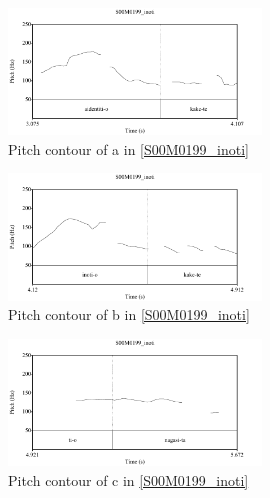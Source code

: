 \begin{figure}
	\begin{center}
	\includegraphics[width=0.6\textwidth]{sounds/S00M0199_aidenthithi.pdf}
	\caption{Pitch contour of a in \ref{S00M0199_inoti}}
	\label{S00M0199_aidenthithiF}
	\end{center}
\end{figure}
\begin{figure}
	\begin{center}
	\includegraphics[width=0.6\textwidth]{sounds/S00M0199_inoti.pdf}
	\caption{Pitch contour of b in \ref{S00M0199_inoti}}
	\label{S00M0199_inotiF}
	\end{center}
\end{figure}
\begin{figure}
	\begin{center}
	\includegraphics[width=0.6\textwidth]{sounds/S00M0199_ti.pdf}
	\caption{Pitch contour of c in \ref{S00M0199_inoti}}
	\label{S00M0199_tiF}
	\end{center}
\end{figure}
